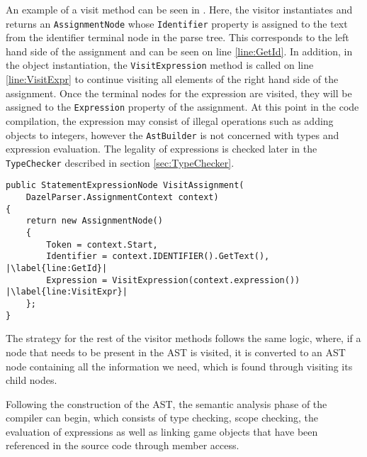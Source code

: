 An example of a visit method can be seen in .
Here, the visitor instantiates and returns an \texttt{AssignmentNode} whose \texttt{Identifier} property is assigned to the text from the identifier terminal node in the parse tree. 
This corresponds to the left hand side of the assignment and can be seen on line \ref{line:GetId}. In addition, in the object instantiation, the \texttt{VisitExpression} method is called on line \ref{line:VisitExpr} to continue visiting all elements of the right hand side of the assignment. Once the terminal nodes for the expression are visited, they will be assigned to the \texttt{Expression} property of the assignment. At this point in the code compilation, the expression may consist of illegal operations such as adding objects to integers, however the \texttt{AstBuilder} is not concerned with types and expression evaluation. The legality of expressions is checked later in the \texttt{TypeChecker} described in section \ref{sec:TypeChecker}.

\begin{lstlisting}[language=CSharp, caption={Visit assignment}, label={lst:VisitAssignment},escapechar=|]
public StatementExpressionNode VisitAssignment(
    DazelParser.AssignmentContext context)
{
    return new AssignmentNode()
    {
        Token = context.Start,
        Identifier = context.IDENTIFIER().GetText(), |\label{line:GetId}|
        Expression = VisitExpression(context.expression()) |\label{line:VisitExpr}|
    };
}
\end{lstlisting}

The strategy for the rest of the visitor methods follows the same logic, where, if a node that needs to be present in the AST is visited, it is converted to an AST node containing all the information we need, which is found through visiting its child nodes.

Following the construction of the AST, the semantic analysis phase of the compiler can begin, which consists of type checking, scope checking, the evaluation of expressions as well as linking game objects that have been referenced in the source code through member access.
